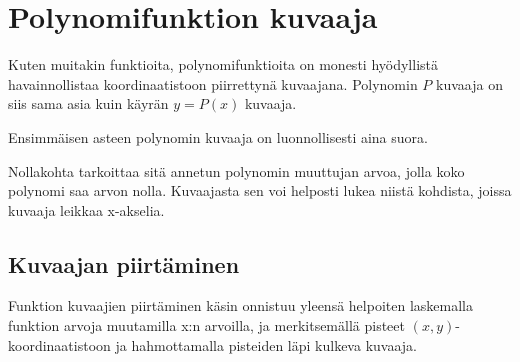 \chapter{Polynomifunktion kuvaaja}
Kuten muitakin funktioita, polynomifunktioita on monesti hyödyllistä
havainnollistaa koordinaatistoon piirrettynä kuvaajana. Polynomin
$P$ kuvaaja on siis sama asia kuin käyrän $y = P(x)$ kuvaaja.

\begin{kuvaajapohja}{1.5}{-2}{2}{-3}{3}
\end{kuvaajapohja}

Ensimmäisen asteen polynomin kuvaaja on luonnollisesti aina suora.

Nollakohta tarkoittaa sitä annetun polynomin muuttujan arvoa, jolla koko
polynomi saa arvon nolla. Kuvaajasta sen voi helposti lukea niistä kohdista,
joissa kuvaaja leikkaa x-akselia.

\section{Kuvaajan piirtäminen}

Funktion kuvaajien piirtäminen käsin onnistuu yleensä helpoiten laskemalla funktion arvoja muutamilla x:n arvoilla, ja merkitsemällä pisteet $(x,y)$-koordinaatistoon ja hahmottamalla pisteiden läpi kulkeva kuvaaja.

